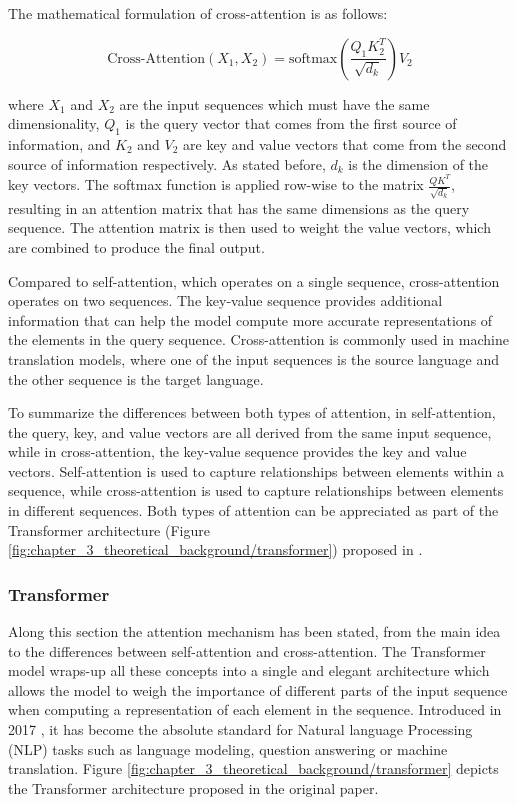 The mathematical formulation of cross-attention is as follows:

\begin{equation}
	\text{Cross-Attention}(X_{1}, X_{2}) = \text{softmax}\left(\frac{Q_{1}K_{2}^T}{\sqrt{d_k}}\right)V_{2}
\end{equation}

where $X_{1}$ and $X_{2}$ are the input sequences which must have the same dimensionality, $Q_{1}$ is the query vector that comes from the first source of information, and $K_{2}$ and $V_{2}$ are key and value vectors that come from the second source of information respectively. As stated before, $d_k$ is the dimension of the key vectors. The softmax function is applied row-wise to the matrix $\frac{QK^T}{\sqrt{d_k}}$, resulting in an attention matrix that has the same dimensions as the query sequence. The attention matrix is then used to weight the value vectors, which are combined to produce the final output.

Compared to self-attention, which operates on a single sequence, cross-attention operates on two sequences. The key-value sequence provides additional information that can help the model compute more accurate representations of the elements in the query sequence. Cross-attention is commonly used in machine translation models, where one of the input sequences is the source language and the other sequence is the target language.

To summarize the differences between both types of attention, in self-attention, the query, key, and value vectors are all derived from the same input sequence, while in cross-attention, the key-value sequence provides the key and value vectors. Self-attention is used to capture relationships between elements within a sequence, while cross-attention is used to capture relationships between elements in different sequences. Both types of attention can be appreciated as part of the Transformer architecture (Figure \ref{fig:chapter_3_theoretical_background/transformer}) proposed in \cite{vaswani2017attention}.

\subsubsection{Transformer}
\label{subsubsec:3_transformer}


Along this section the attention mechanism has been stated, from the main idea to the differences between self-attention and cross-attention. The Transformer model wraps-up all these concepts into a single and elegant architecture which allows the model to weigh the importance of different parts of the input sequence when computing a representation of each element in the sequence. Introduced in 2017 \cite{vaswani2017attention}, it has become the absolute standard for Natural language Processing (NLP) tasks such as language modeling, question answering or machine translation. Figure \ref{fig:chapter_3_theoretical_background/transformer} depicts the Transformer architecture proposed in the original paper.

